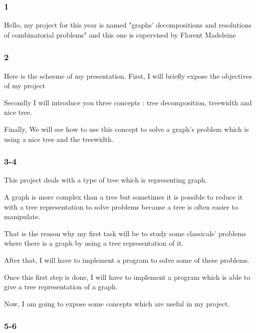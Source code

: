 \documentclass[a4paper, 10pt,french,landscape]{article}
\begin{document}
\begin{multicols}{3}

\subsubsection*{ 1 }

Hello,
my project for this year is named "graphs' decompositions and resolutions of combinatorial problems" 
and this one is supervised by Florent Madeleine

\subsubsection*{ 2}

Here is the scheeme of my presentation. 
First, I will briefly expose the objectives of my project

Secondly I will introduce you three concepts : tree decomposition, treewidth and nice tree.

Finally, We will see how to use this concept to solve a graph's problem which is using a nice tree and the treewidth.


\subsubsection*{ 3-4}





This project deals with a type of tree which is representing graph.

 A graph is more complex than a tree but sometimes it is possible to reduce it with a tree representation to solve problems because a tree is often easier to manipulate.

That is the reason why my first task will be to study some classicals' problems where there is a graph by using a tree representation of it.

After that, I will have to implement a program to solve some of these problems.

Once this first step is done, I will have to implement a program which is able to give a tree representation of a graph.

Now, I am going to expose some concepts which are useful in my project.



\subsubsection*{ 5-6}





\end{multicols}
\end{document}

